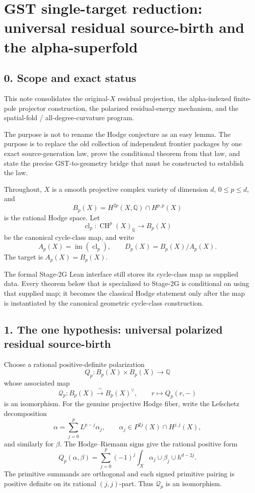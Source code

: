 \section*{GST single-target reduction: universal residual source-birth and the alpha-superfold}

\subsection*{0. Scope and exact status}

This note consolidates the original-\(X\) residual projection, the alpha-indexed finite-pole projector construction, the polarized residual-energy mechanism, and the spatial-fold / all-degree-curvature program.

The purpose is not to rename the Hodge conjecture as an easy lemma. The purpose is to replace the old collection of independent frontier packages by one exact source-generation law, prove the conditional theorem from that law, and state the precise GST-to-geometry bridge that must be constructed to establish the law.

Throughout, \(X\) is a smooth projective complex variety of dimension \(d\), \(0\leq p\leq d\), and
\[
B_p(X)=H^{2p}(X,\mathbb Q)\cap H^{p,p}(X)
\]
is the rational Hodge space. Let
\[
\operatorname{cl}_p:\operatorname{CH}^p(X)_{\mathbb Q}\longrightarrow B_p(X)
\]
be the canonical cycle-class map, and write
\[
A_p(X)=\operatorname{im}(\operatorname{cl}_p),\qquad
D_p(X)=B_p(X)/A_p(X).
\]
The target is \(A_p(X)=B_p(X)\).

The formal Stage-2G Lean interface still stores its cycle-class map as supplied data. Every theorem below that is specialized to Stage-2G is conditional on using that supplied map; it becomes the classical Hodge statement only after the map is instantiated by the canonical geometric cycle-class construction.

\subsection*{1. The one hypothesis: universal polarized residual source-birth}

Choose a rational positive-definite polarization
\[
Q_p:B_p(X)\times B_p(X)\longrightarrow\mathbb Q
\]
whose associated map
\[
\mathcal Q_p:B_p(X)\xrightarrow{\;\sim\;}B_p(X)^\vee,
\qquad
r\longmapsto Q_p(r,-)
\]
is an isomorphism. For the genuine projective Hodge fiber, write the Lefschetz decomposition
\[
\alpha=\sum_{j=0}^{p}L^{p-j}\alpha_j,
\qquad
\alpha_j\in P^{2j}(X)\cap H^{j,j}(X),
\]
and similarly for \(\beta\). The Hodge--Riemann signs give the rational positive form
\[
Q_p(\alpha,\beta)
=
\sum_{j=0}^{p}(-1)^j
\int_X\alpha_j\cup\beta_j\cup h^{d-2j}.
\]
The primitive summands are orthogonal and each signed primitive pairing is positive definite on its rational \((j,j)\)-part. Thus \(\mathcal Q_p\) is an isomorphism.

